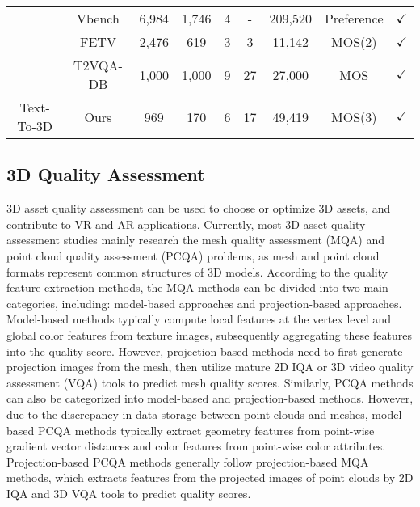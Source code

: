 \begin{table*}[t]
\begin{tabular}{c|c|c|c|c|c|c|c|c}
                               & Vbench\cite{huang2023vbench}             & 6,984         & 1,746   & 4  & -  & 209,520   & Preference         & $\checkmark$  \\
                               & FETV\cite{liu2023fetv}                   & 2,476             & 619     & 3  & 3  & 11,142    & MOS(2)             & $\checkmark$  \\
                               & T2VQA-DB\cite{kou2024subjective}         & 1,000                & 1,000   & 9  & 27 & 27,000    & MOS                & $\checkmark$  \\ \hline
Text-To-3D                     & Ours                                     & 969             & 170     & 6  & 17 & 49,419    & MOS(3)             & $\checkmark$   \\
\bottomrule
\end{tabular}
\vspace{-0.5cm}
\end{table*}
\vspace{-15pt}
\subsection{3D Quality Assessment}
3D asset quality assessment can be used to choose or optimize 3D assets, and contribute to VR \cite{duan2024quick, duan2023attentive, duan2018perceptual} and AR \cite{duan2022augmented, duan2022saliency} applications. Currently, most 3D asset quality assessment studies mainly research the mesh quality assessment (MQA) and point cloud quality assessment (PCQA) problems, as mesh and point cloud formats represent common structures of 3D models. According to the quality feature extraction methods, the MQA methods can be divided into two main categories, including: model-based approaches and projection-based approaches. Model-based methods \cite{m1, tian-color} typically compute local features at the vertex level and global color features from texture images, subsequently aggregating these features into the quality score. However, projection-based methods \cite{zhang2023gms} need to first generate projection images from the mesh, then utilize mature 2D IQA or 3D video quality assessment (VQA) tools to predict mesh quality scores. Similarly, PCQA methods can also be categorized into model-based and projection-based methods. However, due to the discrepancy in data storage between point clouds and meshes, model-based PCQA methods \cite{tian2017geometric, torlig2018novel} typically extract geometry features from point-wise gradient vector distances and color features from point-wise color attributes. Projection-based PCQA methods \cite{zhang2022treating} generally follow projection-based MQA methods,  which extracts features from the projected images of point clouds by 2D IQA and 3D VQA tools to predict quality scores.

